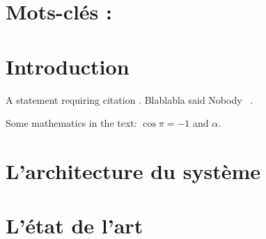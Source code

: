 \documentclass[
10pt, %
a4paper, %
oneside, %
headinclude,footinclude, %
BCOR5mm, %
]{scrartcl}
\begin{document}
\lipsum[1] %


\section*{Mots-clés : }





\newpage %


\section{Introduction}

A statement requiring citation \cite{Figueredo}.
Blablabla said Nobody ~\cite{Nobody06}.

\lipsum[1-3] %

Some mathematics in the text: $\cos\pi=-1$ and $\alpha$.
 
\newpage 
\section{L'architecture du système}

\lipsum[5] %

\newpage 
\section{L'état de l'art}
\end{document}
